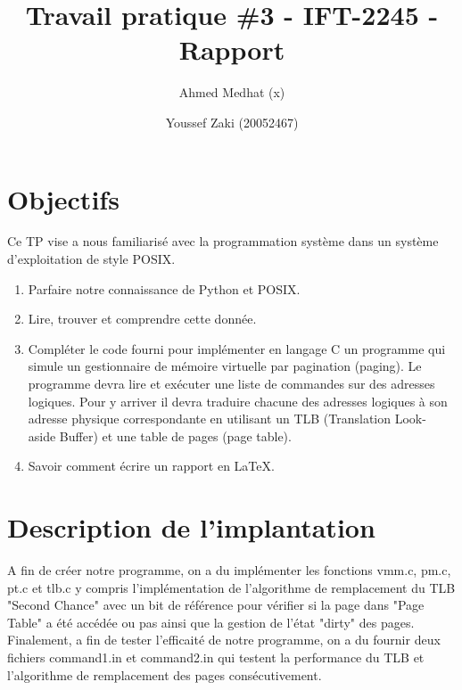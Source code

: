 \documentclass{article}
\title{Travail pratique \#3 - IFT-2245 - Rapport}
\author{Ahmed Medhat (x) \and Youssef Zaki (20052467)}
\begin{document}
\maketitle

\section{Objectifs}

Ce TP vise a nous familiarisé avec la programmation système dans un système 
d'exploitation de style POSIX.

\begin{enumerate}
\item Parfaire notre connaissance de Python et POSIX.
\item Lire, trouver et comprendre cette donnée.
\item Compléter le code fourni pour implémenter en langage C un programme
qui simule un gestionnaire de mémoire virtuelle par pagination (paging). 
Le programme devra lire et exécuter une liste de commandes sur des
adresses logiques. Pour y arriver il devra traduire chacune des adresses logiques
à son adresse physique correspondante en utilisant un TLB (Translation Look-
aside Buffer) et une table de pages (page table).
\item Savoir comment écrire un rapport en LaTeX.
\end{enumerate}


\section{Description de l'implantation}
A fin de créer notre programme, on a du implémenter les fonctions vmm.c, pm.c, pt.c et tlb.c y compris l'implémentation de l'algorithme de remplacement du TLB "Second Chance" avec un bit de référence pour vérifier si la page dans "Page Table" a été accédée ou pas ainsi que la gestion de l'état "dirty" des pages.
Finalement, a fin de tester l'efficaité de notre programme, on a du fournir deux fichiers command1.in et command2.in qui testent la performance du TLB et l'algorithme de remplacement des pages consécutivement.
\end{document}
